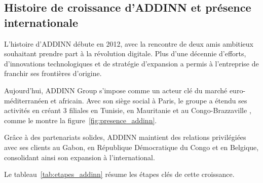     \subsection{Histoire de croissance d’ADDINN et présence internationale\cite{apropos}}
        L’histoire d’ADDINN débute en 2012, avec la rencontre de deux amis ambitieux souhaitant prendre part à la révolution digitale. Plus d’une décennie d’efforts, d’innovations technologiques et de stratégie d’expansion a permis à l’entreprise de franchir ses frontières d’origine.
        \begin{minipage}{.55\textwidth}
            \begin{justify}
                Aujourd’hui, ADDINN Group s’impose comme un acteur clé du marché euro-méditerranéen et africain. Avec son siège social à Paris, le groupe a étendu ses activités en créant 3 filiales en Tunisie, en Mauritanie et au Congo-Brazzaville , comme le montre la figure~\ref{fig:presence_addinn}.
                
                Grâce à des partenariats solides, ADDINN maintient des relations privilégiées avec ses clients au Gabon, en République Démocratique du Congo et en Belgique, consolidant ainsi son expansion à l'international.  
                
                Le tableau~\ref{tab:etapes_addinn} résume les étapes clés de cette croissance.
            \end{justify}
        \end{minipage}
        \hspace{0.1cm}
